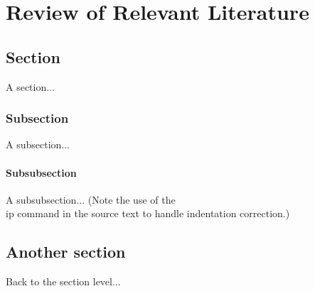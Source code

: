 %

\chapter{Review of Relevant Literature}

\section{Section}
A section...

\subsection{Subsection}
A subsection...

\subsubsection{Subsubsection}
\ip
A subsubsection...  (Note the use of the \\ip command in the source text to handle indentation correction.)

\section{Another section}
Back to the section level...
